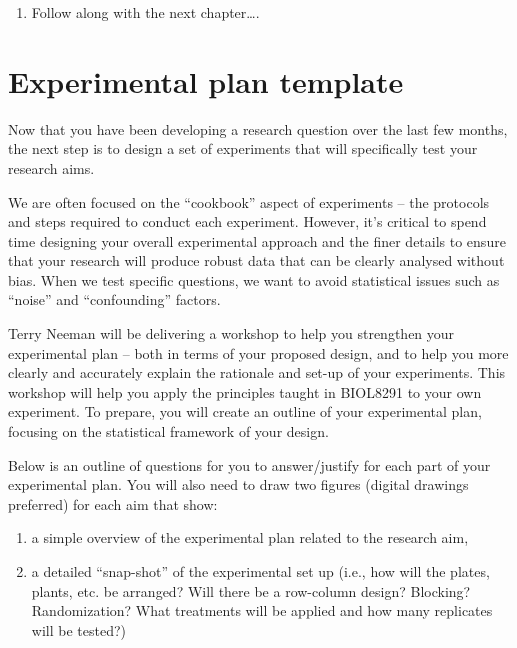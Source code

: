 \documentclass[
]{book}
\providecommand{\tightlist}{%
  \setlength{\itemsep}{0pt}\setlength{\parskip}{0pt}}
\begin{document}
\begin{enumerate}
\def\labelenumi{\arabic{enumi}.}
\setcounter{enumi}{2}
\tightlist
\item
  Follow along with the next chapter\ldots.
\end{enumerate}

\hypertarget{experimental-plan-template}{%
\chapter{Experimental plan template}\label{experimental-plan-template}}

Now that you have been developing a research question over the last few months, the next step is to design a set of experiments that will specifically test your research aims.

We are often focused on the ``cookbook'' aspect of experiments -- the protocols and steps required to conduct each experiment. However, it's critical to spend time designing your overall experimental approach and the finer details to ensure that your research will produce robust data that can be clearly analysed without bias. When we test specific questions, we want to avoid statistical issues such as ``noise'' and ``confounding'' factors.

Terry Neeman will be delivering a workshop to help you strengthen your experimental plan -- both in terms of your proposed design, and to help you more clearly and accurately explain the rationale and set-up of your experiments. This workshop will help you apply the principles taught in BIOL8291 to your own experiment. To prepare, you will create an outline of your experimental plan, focusing on the statistical framework of your design.

Below is an outline of questions for you to answer/justify for each part of your experimental plan. You will also need to draw two figures (digital drawings preferred) for each aim that show:

\begin{enumerate}
\def\labelenumi{\arabic{enumi})}
\tightlist
\item
  a simple overview of the experimental plan related to the research aim,
\item
  a detailed ``snap-shot'' of the experimental set up (i.e., how will the plates, plants, etc. be arranged? Will there be a row-column design? Blocking? Randomization? What treatments will be applied and how many replicates will be tested?)
\end{enumerate}
\end{document}
